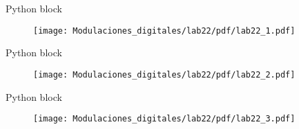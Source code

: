 \begin{frame}{Python block}
\vspace{-1cm}
\begin{figure}[H]
\centering
\texttt{[image: Modulaciones\_digitales/lab22/pdf/lab22\_1.pdf]}
\end{figure}
\end{frame}

\begin{frame}{Python block}
\vspace{-1.5cm}
\begin{figure}[H]
\centering
\texttt{[image: Modulaciones\_digitales/lab22/pdf/lab22\_2.pdf]}
\end{figure}
\end{frame}

\begin{frame}{Python block}
\vspace{-1.5cm}
\begin{figure}[H]
\centering
\texttt{[image: Modulaciones\_digitales/lab22/pdf/lab22\_3.pdf]}
\end{figure}
\end{frame}

